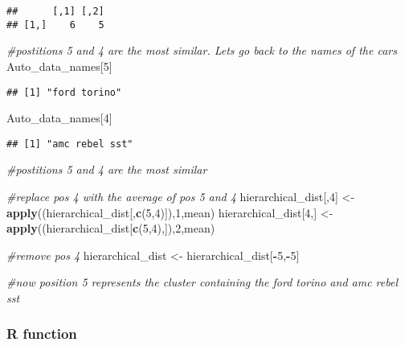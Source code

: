 \documentclass[11pt,]{article}
\newenvironment{Shaded}{\begin{snugshade}}{\end{snugshade}}
\newcommand{\CommentTok}[1]{\textcolor[rgb]{0.56,0.35,0.01}{\textit{#1}}}
\newcommand{\DecValTok}[1]{\textcolor[rgb]{0.00,0.00,0.81}{#1}}
\newcommand{\KeywordTok}[1]{\textcolor[rgb]{0.13,0.29,0.53}{\textbf{#1}}}
\newcommand{\NormalTok}[1]{#1}
\newcommand{\OperatorTok}[1]{\textcolor[rgb]{0.81,0.36,0.00}{\textbf{#1}}}
\newcommand{\StringTok}[1]{\textcolor[rgb]{0.31,0.60,0.02}{#1}}
\begin{document}
\begin{verbatim}
##      [,1] [,2]
## [1,]    6    5
\end{verbatim}

\begin{Shaded}
\begin{Highlighting}[]
\CommentTok{#postitions 5 and 4 are the most similar. Lets go back to the names of the cars}
\NormalTok{Auto_data_names[}\DecValTok{5}\NormalTok{]}
\end{Highlighting}
\end{Shaded}

\begin{verbatim}
## [1] "ford torino"
\end{verbatim}

\begin{Shaded}
\begin{Highlighting}[]
\NormalTok{Auto_data_names[}\DecValTok{4}\NormalTok{]}
\end{Highlighting}
\end{Shaded}

\begin{verbatim}
## [1] "amc rebel sst"
\end{verbatim}

\begin{Shaded}
\begin{Highlighting}[]
\CommentTok{#postitions 5 and 4 are the most similar}

\CommentTok{#replace pos 4 with the average of pos 5 and 4}
\NormalTok{hierarchical_dist[,}\DecValTok{4}\NormalTok{] <-}\StringTok{ }\KeywordTok{apply}\NormalTok{((hierarchical_dist[,}\KeywordTok{c}\NormalTok{(}\DecValTok{5}\NormalTok{,}\DecValTok{4}\NormalTok{)]),}\DecValTok{1}\NormalTok{,mean)}
\NormalTok{hierarchical_dist[}\DecValTok{4}\NormalTok{,] <-}\StringTok{ }\KeywordTok{apply}\NormalTok{((hierarchical_dist[}\KeywordTok{c}\NormalTok{(}\DecValTok{5}\NormalTok{,}\DecValTok{4}\NormalTok{),]),}\DecValTok{2}\NormalTok{,mean)}

\CommentTok{#remove pos 4}
\NormalTok{hierarchical_dist <-}\StringTok{ }\NormalTok{hierarchical_dist[}\OperatorTok{-}\DecValTok{5}\NormalTok{,}\OperatorTok{-}\DecValTok{5}\NormalTok{]}

\CommentTok{#now position 5 represents the cluster containing the ford torino and amc rebel sst}
\end{Highlighting}
\end{Shaded}

\hypertarget{r-function}{%
\subsubsection{R function}\label{r-function}}
\end{document}
